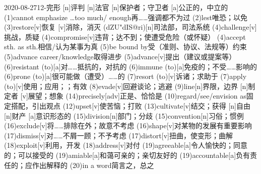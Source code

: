 \documentclass[12pt]{ctexart}
\begin{document}
\begin{wordlist}{2020-08-27}{12-完形}
  [n]{评判}
  [n]{法官}
  [n]{保护者；守卫者}
  [a]{公正的，中立的}
  \word(1){cannot emphasize \dots too much/ enough}{再……强调都不为过}
  \word(2){lest}{唯恐；以免}
  \word[2020-09-11](3){restore}[v]{恢复}
  [v]{消除，消灭}
  (dZU"dIS@ri)[n]{司法部，司法系统}
  \word(4){challenge}[v]{挑战，质疑}
  \word[2020-10-04](4){compromise}[v]{违背；达不到；使遭受危险（或怀疑）}
  \word(4){accept sth. as sth.}{相信/认为某事为真}
  \word[2020-09-03](5){be bound by}{受（准则、协议、法规等）约束}
  \word(5){advance career/knowledge}{取得进步}
  \word[2020-09-21](5){advance}[v]{提出（建议或提案等）}
  \word(6){resistant (to)}[a]{对……抵抗的，对抗的}
  \word(6){immune (to)}[a]{免疫的；不受……影响的}
  \word[2020-08-29](6){prone (to)}[a]{很可能做（遭受）……的}
  \word(7){resort (to)}[v]{诉诸；求助于}
  \word(7){apply (to)}[v]{使用；应用；；有效}
  \word(8){evade}[v]{回避谈论；逃避}
  \word(9){line}[n]{界限，边界}
  [n]{制定者}
  [v]{展望；想象}
  \word(14){precisely}[adv]{正是、恰恰是}
  \word(10){regard/see/envision as}{固定搭配，引出观点}
  \word(12){upset}[v]{使苦恼；打败}
  \word(13){cultivate}[v]{结交；获得}
  [n]{自由}
  [n]{财产}
  [a]{意识形态的}
  \word(15){division}[n]{部门；分歧}
  \word(15){convention}[n]{习俗；惯例}
  \word(16){exclude}[v]{将……排除在外；故意不考虑}
  \word(16){shape}[v]{对某物的发展有重要影响}
  \word(17){dismiss}[v]{对……不屑一顾；不予考虑}
  \word[2020-08-29](17){distort}[v]{扭曲，使变形；曲解}
  \word[2020-08-29](18){exploit}[v]{利用，开发}
  \word(18){address}[v]{对付}
  \word(19){agreeable}[a]{令人愉快的；同意的；可以接受的}
  \word[2020-08-31](19){amiable}[a]{和蔼可亲的；亲切友好的}
  \word[2020-08-29](19){accountable}[a]{负有责任的；应作出解释的}
  \word(20){in a word}{简言之，总之}
\end{wordlist}
\end{document}
